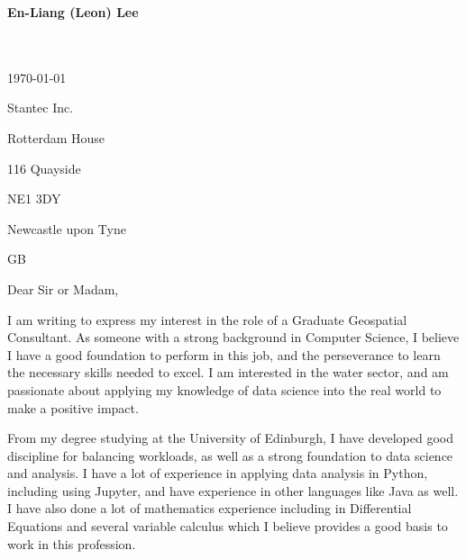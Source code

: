 \documentclass[10pt,english]{article}
\begin{document}
\setlength{\columnsep}{2.2em}
\setlength{\columnseprule}{4pt}



\newpage

\setlength{\columnsep}{2.2em}
\setlength{\columnseprule}{4pt}

\begin{minipage}[c][2.5cm][c]{1\mpwidth}
	\LARGE{\textbf{\textcolor{maincol}{En-Liang (Leon) Lee}}} \\[2pt]
	\normalsize{}\\
	\\
\end{minipage}

\bigskip

\begin{minipage}[c][2.5cm][c]{1\mpwidth}
	\today
	\bigskip

	Stantec Inc.

	Rotterdam House

	116 Quayside

	NE1 3DY

	Newcastle upon Tyne

	GB
\end{minipage}
\bigskip\bigskip

Dear Sir or Madam,
\medskip

I am writing to express my interest in the role of a Graduate Geospatial Consultant. As someone with a strong background in Computer Science, I believe I have a good foundation to perform in this job, and the perseverance to learn the necessary skills needed to excel. I am interested in the water sector, and am passionate about applying my knowledge of data science into the real world to make a positive impact.

\medskip

From my degree studying at the University of Edinburgh, I have developed good discipline for balancing workloads, as well as a strong foundation to data science and analysis. I have a lot of experience in applying data analysis in Python, including using Jupyter, and have experience in other languages like Java as well. I have also done a lot of mathematics experience including in Differential Equations and several variable calculus which I believe provides a good basis to work in this profession.
\end{document}
